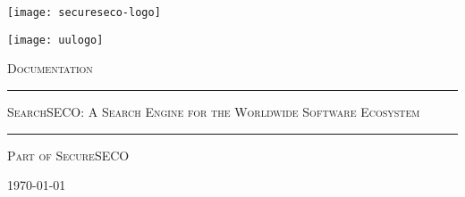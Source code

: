 \documentclass[Documentation]{subfiles}
\begin{document}

\newcommand{\horrule}[1]{\rule{\linewidth}{#1}} %
\begin{titlepage} %
	\noindent
	\begin{minipage}{0.4\textwidth}
		\texttt{[image: secureseco-logo]}
	\end{minipage}
	\hfill
    \begin{minipage}{0.4\textwidth}\raggedleft
		\texttt{[image: uulogo]}
	\end{minipage}
    
    \par\vspace{0cm}
	\vspace{2cm}
    \begin{center}
    \Huge{\textsc{Documentation}}
    
    \vspace{0.5cm}
     \horrule{2pt}
    \vspace{0.1cm}
    \vspace{0pt}\par
    {\Huge{\textsc{{SearchSECO: A Search Engine for the Worldwide Software Ecosystem}}}\par} %
    \vspace{0.1cm}
    \vspace{13pt}\par
    \horrule{2pt}
    \end{center}
	\vspace{1cm}
    {\scshape\Large Part of SecureSECO\par}
	\vspace{0.75cm}
    \centering
    \vspace{0.5cm}
    \par
    \raggedleft

	\vfill
	{\large \today\par}%
    
\end{titlepage}    

\restoregeometry %
\end{document}
